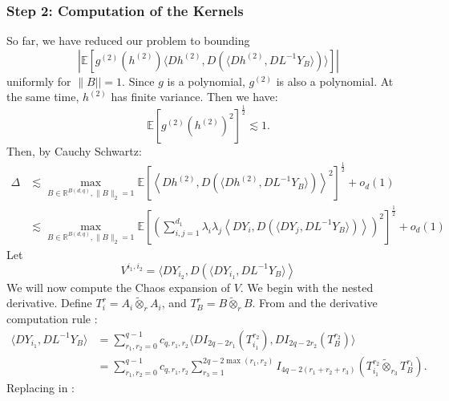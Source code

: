 \documentclass[]{article}
\numberwithin{equation}{section}
\theoremstyle{definition}
\newcommand{\RR}{\mathbb{R}}
\newcommand{\EE}{\mathbb{E}}
\begin{document}
\subsubsection{Step 2: Computation of the Kernels}
So far, we have reduced our problem to bounding 
\begin{equation}
    \left | \EE \left [ g^{(2)}(h^{(2)}) \langle Dh^{(2)}, D \left ( \langle Dh^{(2)}, DL^{-1}Y_{B}\rangle \right ) \rangle\right ]\right | 
\end{equation}
uniformly for $\|B||=1$. Since $g$ is a polynomial, $g^{(2)}$ is also a polynomial. At the same time, $h^{(2)}$ has finite variance. Then we have: 
\begin{equation}
    \EE \left [ g^{(2)}(h^{(2)})^{2}\right ]^{\frac{1}{2}}\lesssim 1. 
\end{equation}
Then, by Cauchy Schwartz: 
\begin{align}
    \Delta &\lesssim \max_{B \in \RR^{B(d,q)}, \| B\|_2 = 1} \EE \left [ \left \langle Dh^{(2)}, D \left ( \langle Dh^{(2)}, DL^{-1}Y_{B} \rangle \right ) \right \rangle^{2}\right ]^{\frac{1}{2}}+o_{d}(1) \\
    & \lesssim \max_{B \in \RR^{B(d,q)}, \| B\|_2 = 1} \EE \left [ \left (\sum_{i,j=1}^{d_1} \lambda_i \lambda_j \left \langle DY_{i}, D \left ( \langle DY_{j}, DL^{-1}Y_{B} \rangle \right ) \right \rangle \right )^{2}\right ]^{\frac{1}{2}}+o_{d}(1)
    \label{eq:operator_norm_subtraction_3}
\end{align} 
Let 
\begin{equation}
    V^{i_1,i_2} =\langle DY_{i_2}, D \left ( \langle DY_{i_1}, DL^{-1}Y_{B}\rangle \right \rangle
    \label{def:V_nested}
\end{equation}
We will now compute the Chaos expansion of $V$. We begin with the nested derivative. Define $T^{r}_{i} = A_{i} \tilde{\otimes}_{r}A_{i}$, and $T^{r}_{B} = B \tilde{\otimes}_{r}B$. From  and the derivative computation rule : 
\begin{align}
    \langle DY_{i_1}, DL^{-1}Y_{B}\rangle & = \sum_{r_1,r_2 = 0}^{q-1} c_{q,r_{1},r_{2}} \langle DI_{2q-2r_{1}}(T^{r_2}_{i_1}), DI_{2q-2r_{2}}(T^{r_2}_{B})\rangle \\
    & = \sum_{r_1,r_2 = 0}^{q-1} c_{q,r_{1},r_{2}} \sum_{r_3=1}^{2q-2\max(r_1, r_2)}I_{4q-2(r_1 + r_2 + r_3)}(T^{r_2}_{i_1} \tilde{\otimes}_{r_3}T^{r_1}_{B}).  
\end{align}
Replacing in :
\end{document}
